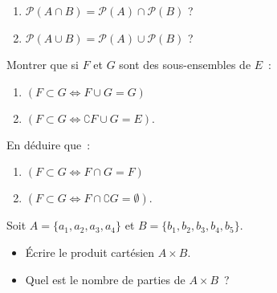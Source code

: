 \documentclass[10pt, a4paper, twocolumn]{homework}
\begin{document}
\begin{enumerate}
  \item $\mathcal{P} (A \cap B) = \mathcal{P} (A) \cap \mathcal{P} (B)$ ?
  \item  $\mathcal{P} (A \cup B) = \mathcal{P} (A) \cup \mathcal{P} (B)$ ?
\end{enumerate}
Montrer que si $F$ et $G$ sont des sous-ensembles de $E$~:
\begin{enumerate}
  \item $(F \subset G \iff F \cup G = G )$
  \item $(F \subset G \iff \complement F \cup G = E).$
\end{enumerate}
En déduire que~: 
\begin{enumerate}
  \item $ (F \subset G \iff F \cap G = F)$
  \item $(F \subset G \iff F \cap\complement G = \emptyset).$ 
\end{enumerate}
 Soit $A= \{a_1, a_2, a_3, a_4\}$ et $B= \{b_1, b_2, b_3, b_4 ,b_5\}$.
 \begin{itemize}
   \item Écrire le produit cartésien $A \times B$.
   \item Quel est le nombre de parties de $A \times B$~?
 \end{itemize}
\end{document}

